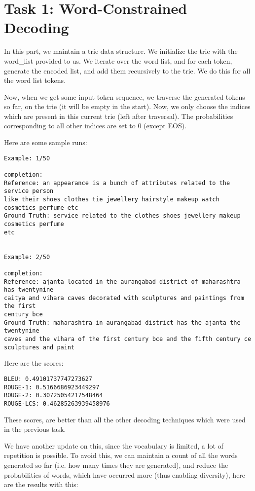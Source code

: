 \documentclass[a4paper,12pt]{article}
\begin{document}
\clearpage
\section{Task 1: Word-Constrained Decoding}
In this part, we maintain a trie data structure. We initialize the trie with the word\_list provided to us. We iterate over the word list, and for each token, generate the encoded list, and add them recursively to the trie. We do this for all the word list tokens.

Now, when we get some input token sequence, we traverse the generated tokens so far, on the trie (it will be empty in the start). Now, we only choose the indices which are present in this current trie (left after traversal). The probabilities corresponding to all other indices are set to 0 (except EOS).

Here are some sample runs:
\begin{verbatim}
Example: 1/50

completion:
Reference: an appearance is a bunch of attributes related to the service person 
like their shoes clothes tie jewellery hairstyle makeup watch cosmetics perfume etc
Ground Truth: service related to the clothes shoes jewellery makeup cosmetics perfume 
etc


Example: 2/50

completion:
Reference: ajanta located in the aurangabad district of maharashtra has twentynine 
caitya and vihara caves decorated with sculptures and paintings from the first
century bce
Ground Truth: maharashtra in aurangabad district has the ajanta the twentynine 
caves and the vihara of the first century bce and the fifth century ce 
sculptures and paint
\end{verbatim}


Here are the scores:

\begin{verbatim}
BLEU: 0.49101737747273627
ROUGE-1: 0.5166686923449297
ROUGE-2: 0.30725054217548464
ROUGE-LCS: 0.46285263939458976
\end{verbatim}


These scores, are better than all the other decoding techniques which were used in the previous task. 


We have another update on this, since the vocabulary is limited, a lot of repetition is possible. To avoid this, we can maintain a count of all the words generated so far (i.e. how many times they are generated), and reduce the probabilities of words, which have occurred more (thus enabling diversity), here are the results with this:
\end{document}

